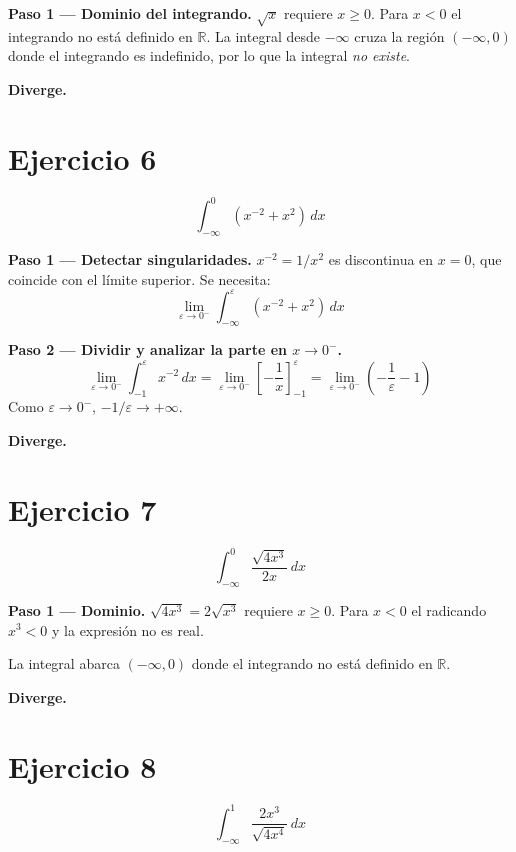 \documentclass[12pt,a4paper]{article}
\newcommand{\diverge}{%
  \textcolor{divcolor}{\textbf{Diverge.}}%
}
\begin{document}
\textbf{Paso 1 — Dominio del integrando.}
$\sqrt{x}$ requiere $x \geq 0$. Para $x < 0$ el integrando no está definido en $\mathbb{R}$.
La integral desde $-\infty$ cruza la región $(-\infty, 0)$ donde el integrando es indefinido, por lo que la integral \emph{no existe}.

\medskip\diverge

\bigskip
\section*{Ejercicio 6}
\[
  \int_{-\infty}^{0} (x^{-2} + x^2)\,dx
\]

\textbf{Paso 1 — Detectar singularidades.}
$x^{-2} = 1/x^2$ es discontinua en $x=0$, que coincide con el límite superior. Se necesita:
\[
  \lim_{\varepsilon\to 0^-}\int_{-\infty}^{\varepsilon}(x^{-2}+x^2)\,dx
\]

\textbf{Paso 2 — Dividir y analizar la parte en $x\to 0^-$.}
\[
  \lim_{\varepsilon\to 0^-}\int_{-1}^{\varepsilon} x^{-2}\,dx
  = \lim_{\varepsilon\to 0^-}\left[-\frac{1}{x}\right]_{-1}^{\varepsilon}
  = \lim_{\varepsilon\to 0^-}\left(-\frac{1}{\varepsilon}-1\right)
\]
Como $\varepsilon\to 0^-$, $-1/\varepsilon \to +\infty$.

\medskip\diverge

\bigskip
\section*{Ejercicio 7}
\[
  \int_{-\infty}^{0} \frac{\sqrt{4x^3}}{2x}\,dx
\]

\textbf{Paso 1 — Dominio.}
$\sqrt{4x^3} = 2\sqrt{x^3}$ requiere $x \geq 0$. Para $x < 0$ el radicando $x^3 < 0$ y la expresión no es real.

La integral abarca $(-\infty, 0)$ donde el integrando no está definido en $\mathbb{R}$.

\medskip\diverge

\bigskip
\section*{Ejercicio 8}
\[
  \int_{-\infty}^{1} \frac{2x^3}{\sqrt{4x^4}}\,dx
\]
\end{document}
